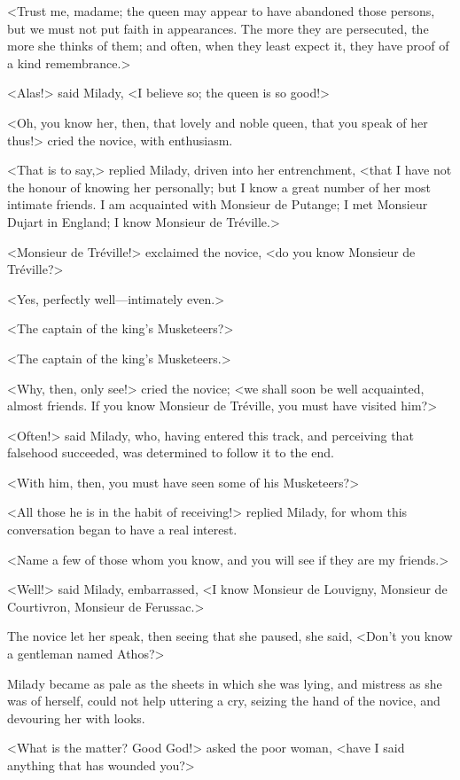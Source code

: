 <Trust me, madame; the queen may appear to have abandoned those persons, but we must not put faith in appearances. The more they are persecuted, the more she thinks of them; and often, when they least expect it, they have proof of a kind remembrance.> 

<Alas!> said Milady, <I believe so; the queen is so good!> 

<Oh, you know her, then, that lovely and noble queen, that you speak of her thus!> cried the novice, with enthusiasm. 

<That is to say,> replied Milady, driven into her entrenchment, <that I have not the honour of knowing her personally; but I know a great number of her most intimate friends. I am acquainted with Monsieur de Putange; I met Monsieur Dujart in England; I know Monsieur de Tréville.> 

<Monsieur de Tréville!> exclaimed the novice, <do you know Monsieur de Tréville?> 

<Yes, perfectly well—intimately even.> 

<The captain of the king's Musketeers?> 

<The captain of the king's Musketeers.> 

<Why, then, only see!> cried the novice; <we shall soon be well acquainted, almost friends. If you know Monsieur de Tréville, you must have visited him?> 

<Often!> said Milady, who, having entered this track, and perceiving that falsehood succeeded, was determined to follow it to the end. 

<With him, then, you must have seen some of his Musketeers?> 

<All those he is in the habit of receiving!> replied Milady, for whom this conversation began to have a real interest. 

<Name a few of those whom you know, and you will see if they are my friends.> 

<Well!> said Milady, embarrassed, <I know Monsieur de Louvigny, Monsieur de Courtivron, Monsieur de Ferussac.> 

The novice let her speak, then seeing that she paused, she said, <Don't you know a gentleman named Athos?> 

Milady became as pale as the sheets in which she was lying, and mistress as she was of herself, could not help uttering a cry, seizing the hand of the novice, and devouring her with looks. 

<What is the matter? Good God!> asked the poor woman, <have I said anything that has wounded you?> 

